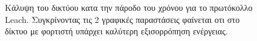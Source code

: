 \begin{figure}[H]
  \centering
  \caption{Κάλυψη του δικτύου κατα την πάροδο του χρόνου για το πρωτόκολλο Leach. Συγκρίνοντας τις 2 γραφικές παραστάσεις φαίνεται οτι στο δίκτυο με
φορτιστή υπάρχει καλύτερη εξισορρόπηση ενέργειας.}
  \label{fig:1exp_4_2}
\end{figure}

